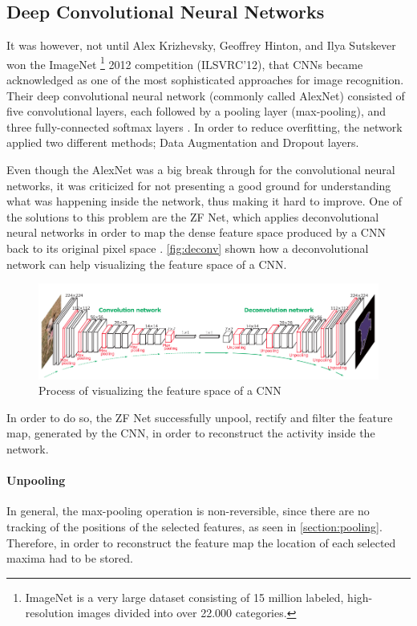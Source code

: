 \subsection{Deep Convolutional Neural Networks}
It was however, not until Alex Krizhevsky, Geoffrey Hinton, and Ilya Sutskever won the ImageNet \footnote{ImageNet is a very large dataset consisting of 15 million labeled, high-resolution images divided into over 22.000 categories.} 2012 competition (ILSVRC'12), that CNNs became acknowledged as one of the most sophisticated approaches for image recognition. Their deep convolutional neural network (commonly called AlexNet) consisted of five convolutional layers, each followed by a pooling layer (max-pooling), and three fully-connected softmax layers \citep{Krizhevsky2012}.  In order to reduce overfitting, the network applied two different methods; Data Augmentation and Dropout layers.

Even though the AlexNet was a big break through for the convolutional neural networks, it was criticized for not presenting a good ground for understanding what was happening inside the network, thus making it hard to improve. One of the solutions to this problem are the ZF Net, which applies deconvolutional neural networks \citep{Zeiler2011} in order to map the dense feature space produced by a CNN back to its original pixel space \citep{Zeiler2014}. \autoref{fig:deconv} shown how a deconvolutional network can help visualizing the feature space of a CNN.

\begin{figure}[!h]
	\centering
	\includegraphics[scale=0.5]{fig/deconv.png}
	\caption{Process of visualizing the feature space of a CNN \citep{Noh2015}}
	\label{fig:deconv}
\end{figure}

In order to do so, the ZF Net successfully unpool, rectify and filter the feature map, generated by the CNN, in order to reconstruct the activity inside the network. 

\paragraph{Unpooling} In general, the max-pooling operation is non-reversible, since there are no tracking of the positions of the selected features, as seen in \autoref{section:pooling}. Therefore, in order to reconstruct the feature map the location of each selected maxima had to be stored.

